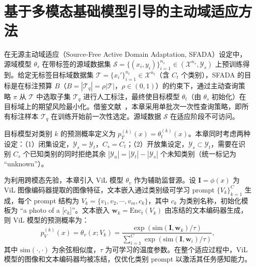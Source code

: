 \section{基于多模态基础模型引导的主动域适应方法}

\label{sec:chap3_damf}

在无源主动域适应（Source-Free Active Domain Adaptation, SFADA）设定中，源域模型 $\theta_s$ 在带标签的源域数据集 $\mathcal{S}=\{(x_i,y_i)\}_{i=1}^{n_s}\in(\mathcal{X}^{n_s},\mathcal{Y}_s)$ 上预训练得到。给定无标签目标域数据集 $\mathcal{T}=\{x_i'\}_{i=1}^{n_t}\in\mathcal{X}^{n_t}$（含 $C_t$ 个类别），SFADA 的目标是在标注预算 $B$（$B=|\mathcal{T}_q|=\rho|\mathcal{T}|$，$\rho\in(0,1)$）的约束下，通过主动查询策略 $\pi$ 从 $\mathcal{T}$ 中选取子集 $\mathcal{T}_q$ 进行人工标注，最终使目标模型 $\theta_t$（由 $\theta_s$ 初始化）在目标域上的期望风险最小化。借鉴文献~\cite{wang2023mhpl,chu2022denoised}，本章采用单批次一次性查询策略，即所有标注样本 $\mathcal{T}_q$ 在训练开始前一次性选定。源域数据 $\mathcal{S}$ 在适应阶段不可访问。

目标模型对类别 $k$ 的预测概率定义为 $p_T^{(k)}(x)=\theta_t^{(k)}(x)$。本章同时考虑两种设定：（1）闭集设定，$\mathcal{Y}_s=\mathcal{Y}_t$，$C_s=C_t$；（2）开放集设定，$\mathcal{Y}_s\subset\mathcal{Y}_t$，需要在识别 $C_s$ 个已知类别的同时拒绝其余 $|\mathcal{Y}_u|=|\mathcal{Y}_t|-|\mathcal{Y}_s|$ 个未知类别（统一标记为 ``unknown''）。

为利用跨模态先验，本章引入 ViL 模型 $\theta_v$ 作为辅助监督源。设 $\mathbf{I}=\phi(x)$ 为 ViL 图像编码器提取的图像特征，文本嵌入通过类别级可学习 prompt $\{V_k\}_{k=1}^{C}$ 生成，每个 prompt 结构为 $V_k=\{v_1,v_2,\cdots,v_m,c_k\}$，其中 $c_k$ 为类别名称，初始化模板为 ``a photo of a [$c_k$]''。文本嵌入 $\mathbf{w}_k=\mathrm{Enc}_t(V_k)$ 由冻结的文本编码器生成，则 ViL 模型的预测概率为：
\begin{equation}
p_V^{(k)}(x) = \theta_v(x; V_k) = \frac{\exp(\mathrm{sim}(\mathbf{I}, \mathbf{w}_k)/\tau)}{\sum_{i=1}^{C}\exp(\mathrm{sim}(\mathbf{I}, \mathbf{w}_i)/\tau)},
\label{eq:vil_pred}
\end{equation}
其中 $\mathrm{sim}(\cdot,\cdot)$ 为余弦相似度，$\tau$ 为可学习的温度参数。在整个适应过程中，ViL 模型的图像和文本编码器均被冻结，仅优化类别 prompt 以激活其任务感知能力。


